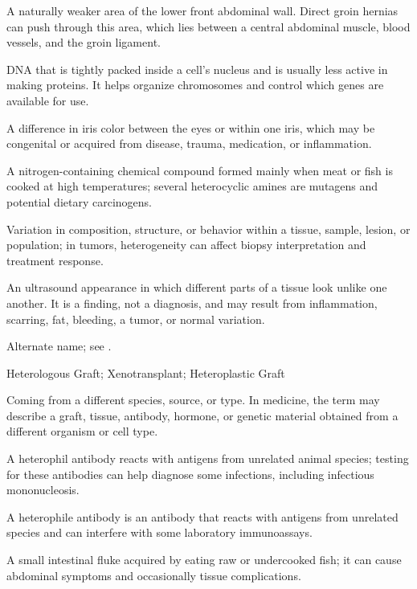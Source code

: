  A naturally weaker area of the lower front abdominal wall. Direct groin hernias can push through this area, which lies between a central abdominal muscle, blood vessels, and the groin ligament.

 DNA that is tightly packed inside a cell’s nucleus and is usually less active in making proteins. It helps organize chromosomes and control which genes are available for use.

 A difference in iris color between the eyes or within one iris, which may be congenital or acquired from disease, trauma, medication, or inflammation.

 A nitrogen-containing chemical compound formed mainly when meat or fish is cooked at high temperatures; several heterocyclic amines are mutagens and potential dietary carcinogens.

 Variation in composition, structure, or behavior within a tissue, sample, lesion, or population; in tumors, heterogeneity can affect biopsy interpretation and treatment response.

 An ultrasound appearance in which different parts of a tissue look unlike one another. It is a finding, not a diagnosis, and may result from inflammation, scarring, fat, bleeding, a tumor, or normal variation.

 Alternate name; see .

\synonyms
Heterologous Graft; Xenotransplant; Heteroplastic Graft

 Coming from a different species, source, or type. In medicine, the term may describe a graft, tissue, antibody, hormone, or genetic material obtained from a different organism or cell type.

 A heterophil antibody reacts with antigens from unrelated animal species; testing for these antibodies can help diagnose some infections, including infectious mononucleosis.

 A heterophile antibody is an antibody that reacts with antigens from unrelated species and can interfere with some laboratory immunoassays.

 A small intestinal fluke acquired by eating raw or undercooked fish; it can cause abdominal symptoms and occasionally tissue complications.

